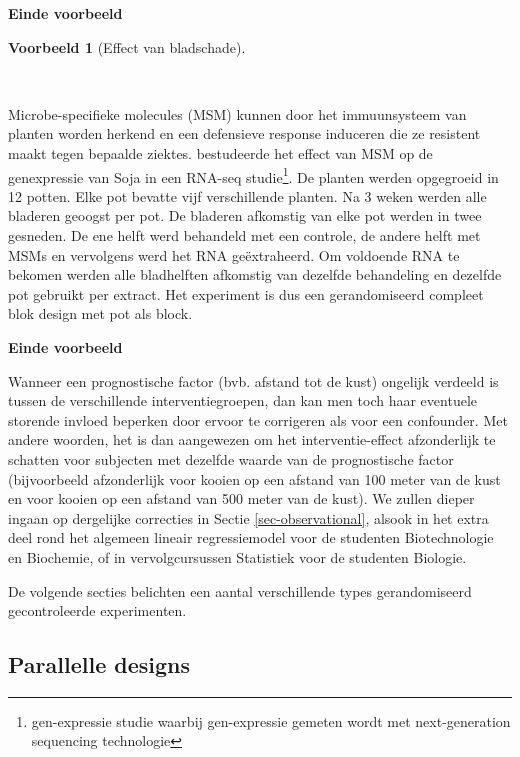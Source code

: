 \documentclass[
  dutch,
  letterpaper,
  12pt]{book}
\theoremstyle{definition}
\theoremstyle{definition}
\theoremstyle{definition}
\newtheorem{example}{Voorbeeld}[chapter]
\theoremstyle{remark}
\begin{document}
\textbf{Einde voorbeeld}

\begin{example}[Effect van
bladschade]\protect\hypertarget{exm-effect-van-bladschade}{}\label{exm-effect-van-bladschade}

~

\end{example}

Microbe-specifieke molecules (MSM) kunnen door het immuunsysteem van
planten worden herkend en een defensieve response induceren die ze
resistent maakt tegen bepaalde ziektes. \citet{Valdes2014} bestudeerde
het effect van MSM op de genexpressie van Soja in een RNA-seq
studie\footnote{gen-expressie studie waarbij gen-expressie gemeten wordt
  met next-generation sequencing technologie}. De planten werden
opgegroeid in 12 potten. Elke pot bevatte vijf verschillende planten. Na
3 weken werden alle bladeren geoogst per pot. De bladeren afkomstig van
elke pot werden in twee gesneden. De ene helft werd behandeld met een
controle, de andere helft met MSMs en vervolgens werd het RNA
geëxtraheerd. Om voldoende RNA te bekomen werden alle bladhelften
afkomstig van dezelfde behandeling en dezelfde pot gebruikt per extract.
Het experiment is dus een gerandomiseerd compleet blok design met pot
als block.

\textbf{Einde voorbeeld}

Wanneer een prognostische factor (bvb. afstand tot de kust) ongelijk
verdeeld is tussen de verschillende interventiegroepen, dan kan men toch
haar eventuele storende invloed beperken door ervoor te corrigeren als
voor een confounder. Met andere woorden, het is dan aangewezen om het
interventie-effect afzonderlijk te schatten voor subjecten met dezelfde
waarde van de prognostische factor (bijvoorbeeld afzonderlijk voor
kooien op een afstand van 100 meter van de kust en voor kooien op een
afstand van 500 meter van de kust). We zullen dieper ingaan op
dergelijke correcties in Sectie \ref{sec-observational}, alsook in het
extra deel rond het algemeen lineair regressiemodel voor de studenten
Biotechnologie en Biochemie, of in vervolgcursussen Statistiek voor de
studenten Biologie.

De volgende secties belichten een aantal verschillende types
gerandomiseerd gecontroleerde experimenten.

\subsection{Parallelle designs}\label{parallelle-designs}
\end{document}
